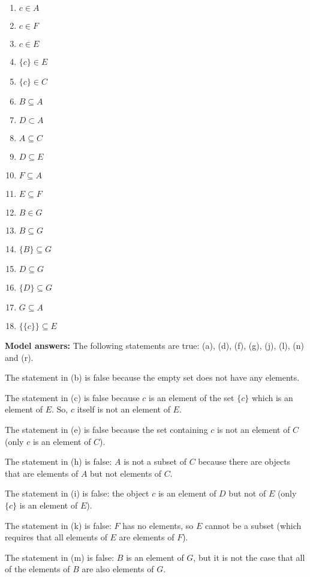 \documentclass[a4,11pt]{article}
\begin{document}
\begin{enumerate}[leftmargin = 12pt]
      \begin{enumerate}[noitemsep]
        \item $c \in A$
        \item $c \in F$
	\item $c \in E$
	\item $\{c\} \in E$
	\item $\{c\} \in C$
	\item $B \subseteq A$
	\item $D \subset A$
	\item $A \subseteq C$
	\item $D \subseteq E$
	\item $F \subseteq A$
	\item $E \subseteq F$
	\item $B \in G$
	\item $B \subseteq G$
	\item $\{B\} \subseteq G$
	\item $D \subseteq G$
	\item $\{D\} \subseteq G$
	\item $G \subseteq A$
	\item $\{\{c\}\} \subseteq E$
         \end{enumerate}
         
 {\bf Model answers:} The following statements are true: (a), (d), (f), (g), (j), (l), (n) and (r).
 
The statement in (b) is false because the empty set does not have any elements.

The statement in (c) is false because $c$ is an element of the set $\{c\}$ which is an element of $E$. So, $c$ itself is not an element of $E$.
 
The statement in (e) is false because the set containing $c$ is not an element of $C$ (only $c$ is an element of $C$).

The statement in (h) is false: $A$ is not a subset of $C$ because there are objects that are elements of $A$ but not elements of $C$.

The statement in (i) is false: the object $c$ is an element of $D$ but not of $E$ (only $\{c\}$ is an element of $E$).

The statement in (k) is false: $F$ has no elements, so $E$ cannot be a subset (which requires that all elements of $E$ are elements of $F$).

The statement in (m) is false: $B$ is an element of $G$, but it is not the case that all of the elements of $B$ are also elements of $G$.


\end{enumerate}
\end{document}
